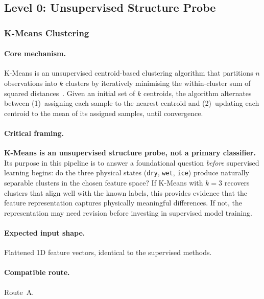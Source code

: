 \subsection{Level 0: Unsupervised Structure Probe}\label{subsec:level0}
\subsubsection{K-Means Clustering}\label{subsec:kmeans}

\paragraph{Core mechanism.}
K-Means is an unsupervised centroid-based clustering algorithm that
partitions $n$ observations into $k$ clusters by iteratively minimising
the within-cluster sum of squared
distances~\cite{lloyd1982kmeans, macqueen1967kmeans}.  Given an
initial set of $k$ centroids, the algorithm alternates between
(1)~assigning each sample to the nearest centroid and (2)~updating
each centroid to the mean of its assigned samples, until convergence.

\paragraph{Critical framing.}
\textbf{K-Means is an unsupervised structure probe, not a primary
classifier.}  Its purpose in this pipeline is to answer a foundational
question \emph{before} supervised learning begins: do the three
physical states (\texttt{dry}, \texttt{wet}, \texttt{ice}) produce
naturally separable clusters in the chosen feature space?  If K-Means
with $k = 3$ recovers clusters that align well with the known labels,
this provides evidence that the feature representation captures
physically meaningful differences.  If not, the representation may
need revision before investing in supervised model training.

\paragraph{Expected input shape.}
Flattened 1D feature vectors, identical to the supervised methods.

\paragraph{Compatible route.}
Route~A.

